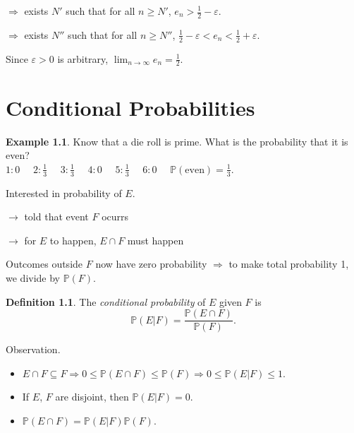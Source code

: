 \documentclass[a4paper,11pt]{amsbook}
\theoremstyle{definition}
\newtheorem{definition}{\hspace{-2em} \color{darkblue} Definition}[chapter]
\newtheorem{example}{\hspace{-2em} \color{darkblue} Example}[chapter]
\theoremstyle{remark}
\renewcommand{\P}{\mathbb{P}}
\newcommand\inc\subseteq
\newcommand\0{\varnothing}
\begin{document}
    $\Rightarrow$ exists $N'$ such that for all $n\geq N'$, $e_n>\frac12-\varepsilon$.
    
    $\Rightarrow$ exists $N''$ such that for all $n\geq N''$, $\frac12-\varepsilon<e_n<\frac12+\varepsilon$.
    
    Since $\varepsilon>0$ is arbitrary, $\lim_{n\to\infty}e_n=\frac12$.

\chapter{Conditional Probabilities}
    \begin{example}
        Know that a die roll is prime. What is the probability that it is even?\\[5pt]
        $1:0\quad$ $2:\frac13\quad$ $3:\frac13\quad$ $4:0\quad$ $5:\frac13\quad$ $6:0\quad$
        $\P(\text{even})=\frac13$.
    \end{example}
    \begin{center}
    \end{center}

    Interested in probability of $E$.

    $\rightarrow$ told that event $F$ ocurrs

    $\rightarrow$ for $E$ to happen, $E\cap F$ must happen

    Outcomes outside $F$ now have zero probability $\Rightarrow$ to make total probability 1, we divide by $\P(F)$.

    \begin{definition}
        The \emph{conditional probability} of $E$ given $F$ is $$\P(E|F)=\frac{\P(E\cap F)}{\P(F)}.$$
    \end{definition}
    \noindent Observation. \begin{itemize}
        \item $E\cap F\inc F\Rightarrow0\leq\P(E\cap F)\leq\P(F)\Rightarrow0\leq\P(E|F)\leq1$.
        \item If $E$, $F$ are disjoint, then $\P(E|F)=0$.
        \item $\P(E\cap F)=\P(E|F)\P(F)$. 
    \end{itemize}
\end{document}

